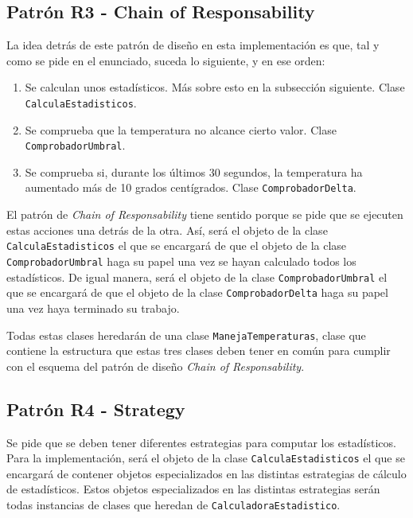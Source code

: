 \subsection{Patrón R3 - Chain of Responsability}

La idea detrás de este patrón de diseño en esta implementación es que, tal y como se pide en el enunciado, suceda lo siguiente, y en ese orden:

\begin{enumerate}
    \item Se calculan unos estadísticos. Más sobre esto en la subsección siguiente. Clase \texttt{CalculaEstadisticos}.

    \item Se comprueba que la temperatura no alcance cierto valor. Clase \texttt{ComprobadorUmbral}.

    \item Se comprueba si, durante los últimos 30 segundos, la temperatura ha aumentado más de 10 grados centígrados. Clase \texttt{ComprobadorDelta}.
\end{enumerate}

El patrón de \textit{Chain of Responsability} tiene sentido porque se pide que se ejecuten estas acciones una detrás de la otra. Así, será el objeto de la clase \texttt{CalculaEstadisticos} el que se encargará de que el objeto de la clase \texttt{ComprobadorUmbral} haga su papel una vez se hayan calculado todos los estadísticos. De igual manera, será el objeto de la clase \texttt{ComprobadorUmbral} el que se encargará de que el objeto de la clase \texttt{ComprobadorDelta} haga su papel una vez haya terminado su trabajo.

Todas estas clases heredarán de una clase \texttt{ManejaTemperaturas}, clase que contiene la estructura que estas tres clases deben tener en común para cumplir con el esquema del patrón de diseño \textit{Chain of Responsability}.

\subsection{Patrón R4 - Strategy}

Se pide que se deben tener diferentes estrategias para computar los estadísticos. Para la implementación, será el objeto de la clase \texttt{CalculaEstadisticos} el que se encargará de contener objetos especializados en las distintas estrategias de cálculo de estadísticos. Estos objetos especializados en las distintas estrategias serán todas instancias de clases que heredan de \texttt{CalculadoraEstadistico}.
